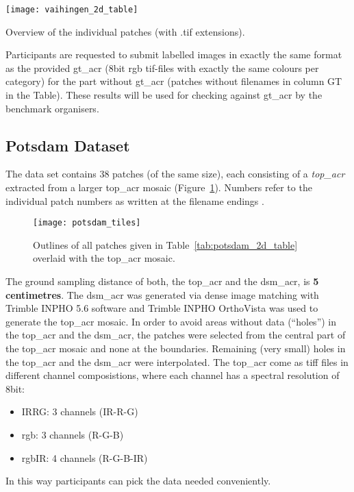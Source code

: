 \begin{table}[h]
    \centering
    \texttt{[image: vaihingen\_2d\_table]}
    \caption{Overview of the individual patches (with .tif extensions).}
    \label{tab:vaihingen_2d_table}
\end{table}


Participants are requested to submit labelled images in exactly the same format
as the provided \acrshort{gt_acr} (8bit \acrshort{rgb} tif-files with exactly the
same colours per category) for the part without \acrshort{gt_acr} (patches without
filenames in column GT in the Table). These results will be used for checking
against \acrshort{gt_acr} by the benchmark organisers.

\subsection{Potsdam Dataset}
The data set contains 38 patches (of the same size), each consisting of a
\emph{\acrfull{top_acr}} extracted from a larger \acrshort{top_acr} mosaic
(Figure~\ref{fig:potsdam_tiles}). Numbers refer to the individual patch
numbers as written at the filename endings \cite{potsdam_isprs}.
\begin{figure}
    \centering
    \texttt{[image: potsdam\_tiles]}
    \caption{Outlines of all patches given in Table~\ref{tab:potsdam_2d_table}
    overlaid with the \acrshort{top_acr} mosaic.}
    \label{fig:potsdam_tiles}
\end{figure}


The ground sampling distance of both, the \acrshort{top_acr} and the
\acrshort{dsm_acr}, is \textbf{5 centimetres}. The \acrshort{dsm_acr} was
generated via dense image matching with Trimble INPHO 5.6 software and Trimble
INPHO OrthoVista was used to generate the \acrshort{top_acr} mosaic. In order to
avoid areas without data (``holes'') in the \acrshort{top_acr} and the
\acrshort{dsm_acr}, the patches were selected from the central part of the
\acrshort{top_acr} mosaic and none at the boundaries. Remaining (very small)
holes in the \acrshort{top_acr} and the \acrshort{dsm_acr} were interpolated.
The \acrshort{top_acr} come as \acrshort{tiff} files in different channel
composistions, where each channel has a spectral resolution of 8bit:
\begin{itemize}
    \item IRRG: 3 channels (IR-R-G)
    \item \acrshort{rgb}: 3 channels (R-G-B)
    \item \acrshort{rgb}IR: 4 channels (R-G-B-IR)
\end{itemize}
In this way participants can pick the data needed conveniently.



